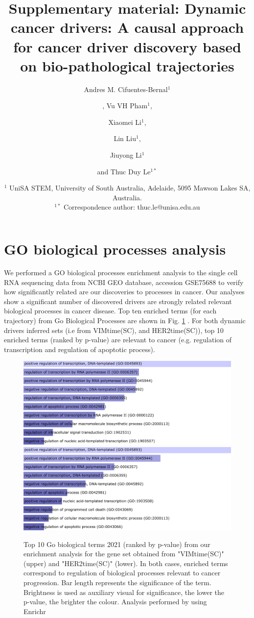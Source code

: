 \documentclass[]{article}
\title{Supplementary material: Dynamic cancer drivers: A causal approach for cancer driver discovery based on bio-pathological trajectories}
\author{Andres M. Cifuentes-Bernal$^{{ }1}$\and, Vu VH Pham$^{1}$,\and Xiaomei Li$^{1}$,\and Lin Liu$^{1}$,\and Jiuyong Li$^{ 1}$ \and and Thuc Duy Le$^{1*}$}
\date{$^1$ UniSA STEM, University of South Australia, Adelaide, 5095 Mawson Lakes SA, Australia.\\ $^{1*}$ \small{Correspondence author: thuc.le@unisa.edu.au}}
\begin{document}
\maketitle

\section{GO biological processes analysis}

We performed a GO biological processes enrichment analysis to the single cell RNA sequencing data from NCBI GEO database, accession GSE75688  \cite{Chung2017} to verify how significantly related are our discoveries to processes in cancer. Our analyses show a significant number of discovered
drivers are strongly related relevant biological processes in cancer disease. Top ten enriched terms (for each trajectory) from Go Biological
Processes are shown in Fig. \ref{fig:vimher2gobiologicalprocess2021} . For both dynamic drivers inferred sets (i.e from VIMtime(SC), and HER2time(SC)), top 10 enriched terms (ranked by p-value) are relevant to cancer (e.g.
regulation of transcription and regulation of apoptotic process).

\begin{figure}[h]
	\centering
	\includegraphics[width=0.8\linewidth]{./GO_Biological_Process_2021_bar_SC_VIM06.eps}
	\includegraphics[width=0.8\linewidth]{./GO_Biological_Process_2021_bar_SC_HER206.eps}
	\caption{Top 10 Go biological terms 2021 (ranked by p-value) from our enrichment analysis for the gene set obtained from "VIMtime(SC)" (upper) and "HER2time(SC)" (lower). In both cases, enriched terms correspond to regulation of biological processes relevant to cancer progression. Bar length represents the significance of the term. Brightness is used as auxiliary visual for significance, the lower the p-value, the brighter the colour. Analysis performed by using Enrichr \cite{Kuleshov2016}}
	\label{fig:vimher2gobiologicalprocess2021}
\end{figure}
\end{document}
